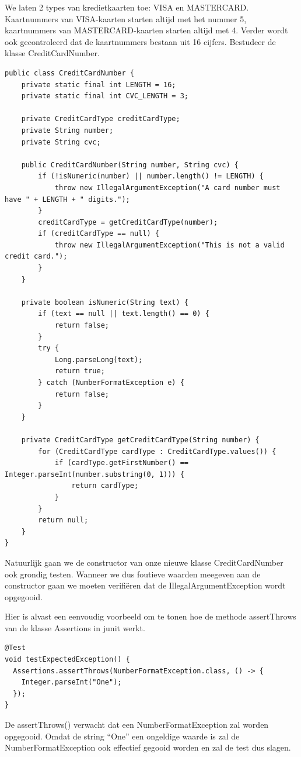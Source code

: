 \documentclass{tstextbook}
\begin{document}
We laten 2 types van kredietkaarten toe: VISA en MASTERCARD. Kaartnummers van VISA-kaarten starten altijd met het nummer 5, kaartnummers van MASTERCARD-kaarten starten altijd met 4.
Verder wordt ook gecontroleerd dat de kaartnummers bestaan uit 16 cijfers. Bestudeer de klasse CreditCardNumber.

\begin{lstlisting}
public class CreditCardNumber {
	private static final int LENGTH = 16;
	private static final int CVC_LENGTH = 3;

	private CreditCardType creditCardType;
	private String number;
	private String cvc;

	public CreditCardNumber(String number, String cvc) {
		if (!isNumeric(number) || number.length() != LENGTH) {
			throw new IllegalArgumentException("A card number must have " + LENGTH + " digits.");
		}
		creditCardType = getCreditCardType(number);
		if (creditCardType == null) {
			throw new IllegalArgumentException("This is not a valid credit card.");
		}
	}

	private boolean isNumeric(String text) {
		if (text == null || text.length() == 0) {
			return false;
		}
		try {
			Long.parseLong(text);
			return true;
		} catch (NumberFormatException e) {
			return false;
		}
	}

	private CreditCardType getCreditCardType(String number) {
		for (CreditCardType cardType : CreditCardType.values()) {
			if (cardType.getFirstNumber() == Integer.parseInt(number.substring(0, 1))) {
				return cardType;
			}
		}
		return null;
	}
}
\end{lstlisting} 

Natuurlijk gaan we de constructor van onze nieuwe klasse CreditCardNumber ook grondig testen.  Wanneer we dus foutieve waarden meegeven aan de constructor gaan we moeten verifi\"eren dat de IllegalArgumentException wordt opgegooid.

Hier is alvast een eenvoudig voorbeeld om te tonen hoe de methode assertThrows van de klasse Assertions in junit werkt.

\begin{lstlisting}
@Test
void testExpectedException() {
  Assertions.assertThrows(NumberFormatException.class, () -> {
    Integer.parseInt("One");
  });
}
\end{lstlisting}

De assertThrows() verwacht dat een NumberFormatException zal worden opgegooid. Omdat de string ``One'' een ongeldige waarde is zal de NumberFormatException ook effectief gegooid worden en zal de test dus slagen.
\end{document}
